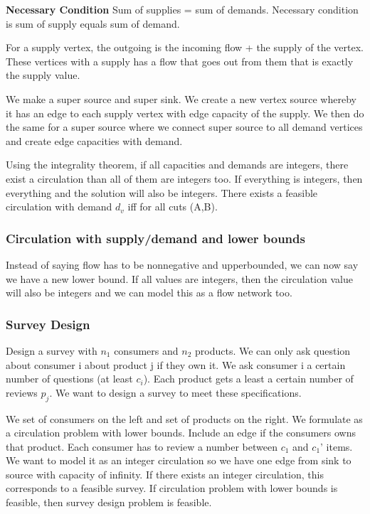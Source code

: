\documentclass[11pt, oneside]{article}
\theoremstyle{definition}
\begin{document}
\textbf{Necessary Condition} Sum of supplies = sum of demands. Necessary condition is sum of supply equals sum of demand.

For a supply vertex, the outgoing is the incoming flow + the supply of the vertex. These vertices with a supply has a flow that goes out from them that is exactly the supply value.

We make a super source and super sink. We create a new vertex source whereby it has an edge to each supply vertex with edge capacity of the supply. We then do the same for a super source where we connect super source to all demand vertices and create edge capacities with demand.

Using the integrality theorem, if all capacities and demands are integers, there exist a circulation than all of them are integers too.
If everything is integers, then everything and the solution will also be integers. There exists a feasible circulation with demand $d_v$ iff for all cuts (A,B).

\subsubsection{Circulation with supply/demand and lower bounds}

Instead of saying flow has to be nonnegative and upperbounded, we can now say we have a new lower bound. If all values are integers, then the circulation value will also be integers and we can model this as a flow network too.

\subsubsection{Survey Design}
Design a survey with $n_1$ consumers and $n_2$ products. We can only ask question about consumer i about product j if they own it. We ask consumer i a certain number of questions (at least $c_i$). Each product gets a least a certain number of reviews $p_j$. We want to design a survey to meet these specifications.

We set of consumers on the left and set of products on the right. We formulate as a circulation problem with lower bounds. Include an edge if the consumers owns that product. Each consumer has to review a number between $c_1$ and $c_1$' items. We want to model it as an integer circulation so we have one edge from sink to source with capacity of infinity. If there exists an integer circulation, this corresponds to a feasible survey. If circulation problem with lower bounds is feasible, then survey design problem is feasible.
\end{document}
